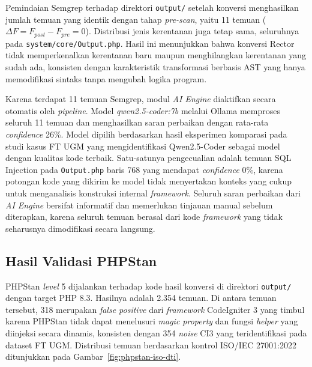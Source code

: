 Pemindaian Semgrep terhadap direktori \texttt{output/} setelah 
konversi menghasilkan jumlah temuan yang identik dengan tahap 
\textit{pre-scan}, yaitu 11 temuan 
($\Delta F = F_{post} - F_{pre} = 0$). Distribusi jenis 
kerentanan juga tetap sama, seluruhnya pada 
\texttt{system/core/\allowbreak Output.php}. Hasil ini menunjukkan bahwa 
konversi Rector tidak memperkenalkan kerentanan baru maupun 
menghilangkan kerentanan yang sudah ada, konsisten dengan 
karakteristik transformasi berbasis AST yang hanya memodifikasi 
sintaks tanpa mengubah logika program.

Karena terdapat 11 temuan Semgrep, modul \textit{AI Engine} diaktifkan
secara otomatis oleh \textit{pipeline}. Model
\textit{qwen2.5-coder:7b} melalui Ollama memproses seluruh
11 temuan dan menghasilkan saran perbaikan dengan rata-rata
\textit{confidence} 26\%. Model dipilih berdasarkan hasil
eksperimen komparasi pada studi kasus FT UGM yang
mengidentifikasi Qwen2.5-Coder sebagai model dengan kualitas
kode terbaik. Satu-satunya pengecualian adalah
temuan SQL Injection pada \texttt{Output.php} baris 768 yang
mendapat \textit{confidence} 0\%, karena potongan kode yang
dikirim ke model tidak menyertakan konteks yang cukup untuk
menganalisis konstruksi internal \textit{framework}. Seluruh 
saran perbaikan dari \textit{AI Engine} bersifat informatif dan 
memerlukan tinjauan manual sebelum diterapkan, karena seluruh 
temuan berasal dari kode \textit{framework} yang tidak 
seharusnya dimodifikasi secara langsung.

\subsection{Hasil Validasi PHPStan}

PHPStan \textit{level} 5 dijalankan terhadap kode hasil 
konversi di direktori \texttt{output/} dengan target PHP 8.3. 
Hasilnya adalah 2.354 temuan. Di antara temuan tersebut, 318
merupakan \textit{false positive} dari \textit{framework} CodeIgniter 3
yang timbul karena PHPStan tidak dapat menelusuri \textit{magic property}
dan fungsi \textit{helper} yang diinjeksi secara dinamis, konsisten dengan
354 \textit{noise} CI3 yang teridentifikasi pada dataset FT UGM. Distribusi temuan berdasarkan
kontrol ISO/IEC 27001:2022 ditunjukkan pada Gambar~\ref{fig:phpstan-iso-dti}.

